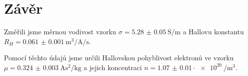 \section*{Závěr}
Změřili jsme měrnou vodivost vzorku $\sigma = \SI{5.28(5)}{\siemens\per\meter}$ a Hallovu konstantu $R_H = \SI{0.061(1)}{\meter\cubed\per\ampere\per\second}$.

Pomocí těchto údajů jsme určili Hallovskou pohyblivost elektronů ve vzorku $\mu = \SI{0.324(3)}{\ampere\second\squared\per\kg}$ a jejich koncentraci $n = \num{1.07(1)} \cdot \SI{e20}{\per\metre\cubed}$.